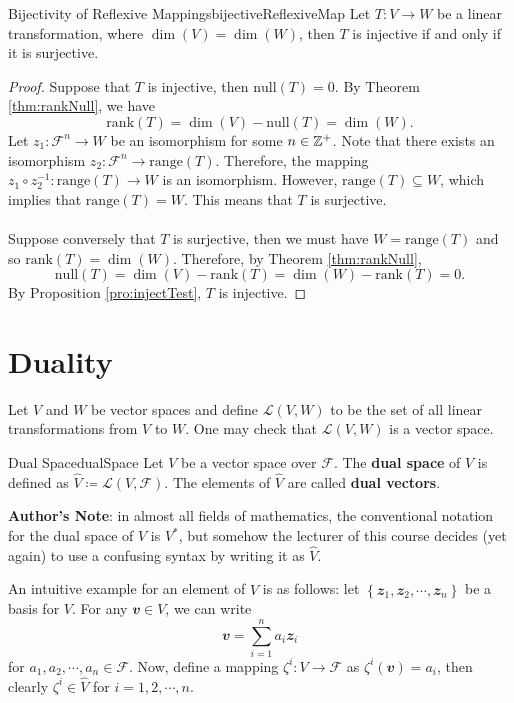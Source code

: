 \documentclass[math, code]{amznotes}
\theoremstyle{remark}
\begin{document}
\begin{corbox}{Bijectivity of Reflexive Mappings}{bijectiveReflexiveMap}
    Let $T \colon V \to W$ be a linear transformation, where $\dim(V) = \dim(W)$, then $T$ is injective if and only if it is surjective.
    \tcblower
    \begin{proof}
        Suppose that $T$ is injective, then $\mathrm{null}(T) = 0$. By Theorem \ref{thm:rankNull}, we have 
        \begin{equation*}
            \mathrm{rank}(T) = \dim(V) - \mathrm{null}(T) = \dim(W).
        \end{equation*} 
        Let $z_1 \colon \mathcal{F}^n \to W$ be an isomorphism for some $n \in \mathbb{Z}^+$. Note that there exists an isomorphism $z_2 \colon \mathcal{F}^n \to \mathrm{range}(T)$. Therefore, the mapping $z_1 \circ z_2^{-1} \colon \mathrm{range}(T) \to W$ is an isomorphism. However, $\mathrm{range}(T) \subseteq W$, which implies that $\mathrm{range}(T) = W$. This means that $T$ is surjective.
        \\\\
        Suppose conversely that $T$ is surjective, then we must have $W = \mathrm{range}(T)$ and so $\mathrm{rank}(T) = \dim(W)$. Therefore, by Theorem \ref{thm:rankNull}, 
        \begin{equation*}
            \mathrm{null}(T) = \dim(V) - \mathrm{rank}(T) = \dim(W) - \mathrm{rank}(T) = 0.
        \end{equation*}
        By Proposition \ref{pro:injectTest}, $T$ is injective.
    \end{proof}
\end{corbox}
\section{Duality}
Let $V$ and $W$ be vector spaces and define $\mathcal{L}(V, W)$ to be the set of all linear transformations from $V$ to $W$. One may check that $\mathcal{L}(V, W)$ is a vector space.
\begin{dfnbox}{Dual Space}{dualSpace}
    Let $V$ be a vector space over $\mathcal{F}$. The {\color{red} \textbf{dual space}} of $V$ is defined as $\hat{V} \coloneqq \mathcal{L}(V, \mathcal{F})$. The elements of $\hat{V}$ are called {\color{red} \textbf{dual vectors}}.
\end{dfnbox}
\begin{notebox}
    \textbf{Author's Note}: in almost all fields of mathematics, the conventional notation for the dual space of $V$ is $V^*$, but somehow the lecturer of this course decides (yet again) to use a confusing syntax by writing it as $\hat{V}$.
\end{notebox}
An intuitive example for an element of $\hat{V}$ is as follows: let $\left\{\mathbfit{z}_1, \mathbfit{z}_2, \cdots, \mathbfit{z}_n\right\}$ be a basis for $V$. For any $\mathbfit{v} \in V$, we can write
\begin{equation*}
    \mathbfit{v} = \sum_{i = 1}^{n}a_i\mathbfit{z}_i
\end{equation*}
for $a_1, a_2, \cdots, a_n \in \mathcal{F}$. Now, define a mapping $\zeta^i \colon V \to \mathcal{F}$ as $\zeta^i(\mathbfit{v}) = a_i$, then clearly $\zeta^i \in \hat{V}$ for $i = 1, 2, \cdots, n$.
\end{document}
